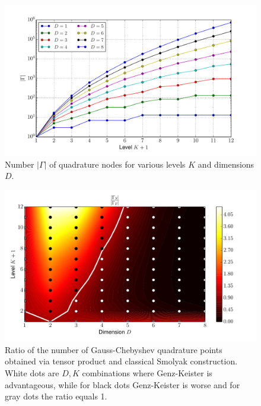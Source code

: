 \documentclass[a4paper,10pt]{article}
\begin{document}
\begin{figure}
  \centering
  \includegraphics[width=\linewidth]{./img/number_nodes_levdim_chebyshevt.pdf}
  \caption{Number $|\Gamma|$ of quadrature nodes for various levels $K$ and dimensions $D$.}
  \label{fig:number_nodes_levdim_chebyshevt}
\end{figure}

\begin{figure}[h]
  \centering
  \includegraphics[width=0.8\linewidth]{./img/smol_chebyshevt_ratio.pdf}
  \caption{Ratio of the number of Gauss-Chebyshev quadrature points obtained
  via tensor product and classical Smolyak construction. White dots are $D,K$
  combinations where Genz-Keister is advantageous, while for black dots
  Genz-Keister is worse and for gray dots the ratio equals 1.}
  \label{fig:smol_chebyshevt_ratio}
\end{figure}
\end{document}
